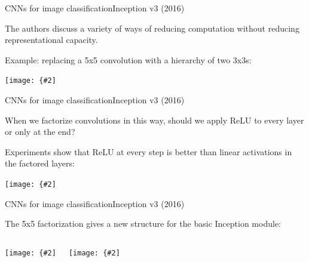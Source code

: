 \documentclass[aspectratio=169]{beamer}
\newcommand{\myfig}[3]{\centerline{\texttt{[image: \{\#2]}}}
\begin{document}
\begin{frame}{CNNs for image classification}{Inception v3 (2016)}

  The authors discuss a variety of ways of reducing computation
  without reducing representational capacity.

  \medskip

  Example: replacing a 5x5 convolution with a hierarchy of two
  3x3s:

  \medskip

  \myfig{2in}{szegedy-15-fig1}{Szegedy et al. (2016), Figure 1}

\end{frame}


\begin{frame}{CNNs for image classification}{Inception v3 (2016)}

  When we factorize convolutions in this way, should we apply
  ReLU to every layer or only at the end?

  \medskip

  Experiments show that ReLU at every step is better than linear
  activations in the factored layers:

  \medskip

  \myfig{3in}{szegedy-15-fig2}{Szegedy et al. (2016), Figure 2}

\end{frame}


\begin{frame}{CNNs for image classification}{Inception v3 (2016)}

  The 5x5 factorization gives a new structure for the basic
  Inception module:

  \begin{columns}

  \column{2in}

  \myfig{1.5in}{szegedy-15-fig4}{Szegedy et al. (2016), Figure 4}

  \column{2in}

  \myfig{1.5in}{szegedy-15-fig5}{Szegedy et al. (2016), Figure 5}

  \end{columns}

\end{frame}
\end{document}
